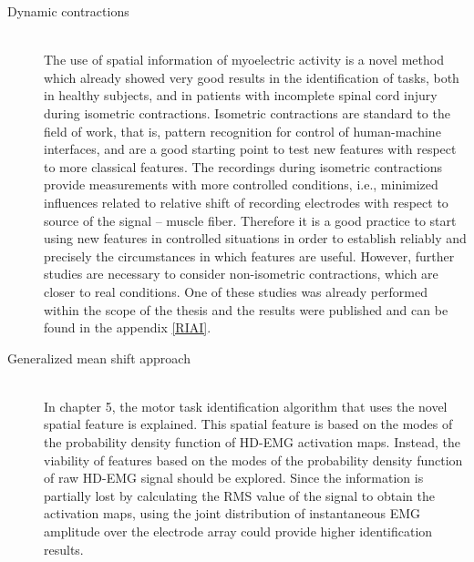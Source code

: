 \begin{description}
\item[Dynamic contractions] \hfill \\ 
	The use of spatial information of myoelectric activity is a novel method which already showed very good results in the identification of tasks, both in healthy subjects, and in patients with incomplete spinal cord injury during isometric contractions. Isometric contractions are standard to the field of work, that is, pattern recognition for control of human-machine interfaces, and are a good starting point to test new features with respect to more classical features. The recordings during isometric contractions provide measurements with more controlled conditions, i.e., minimized influences related to relative shift of recording electrodes with respect to source of the signal – muscle fiber. Therefore it is a good practice to start using new features in controlled situations in order to establish reliably and precisely the circumstances in which features are useful. However, further studies are necessary to consider non-isometric contractions, which are closer to real conditions. One of these studies was already performed within the scope of the thesis and the results were published \citep{Rojas-Martinez2017} and can be found in the appendix \ref{RIAI}.
	
	
	

\item[Generalized mean shift approach] \hfill \\
	In chapter 5, the motor task identification algorithm that uses the novel spatial feature is explained. This spatial feature is based on the modes of the probability density function of HD-EMG activation maps. Instead, the viability of features based on the  modes of the probability density function of raw HD-EMG signal should be explored. Since the information is partially lost by calculating the RMS value of the signal to obtain the activation maps, using the joint distribution of instantaneous EMG amplitude over the electrode array could provide higher identification results.
	

\end{description}
